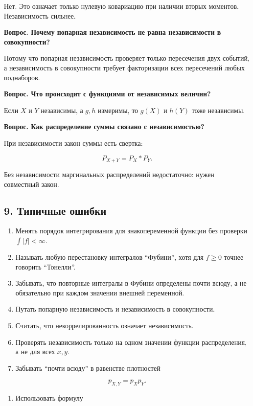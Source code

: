 \documentclass[
  11pt,
  a4paper,
]{article}
\providecommand{\tightlist}{%
  \setlength{\itemsep}{0pt}\setlength{\parskip}{0pt}}
\begin{document}
Нет. Это означает только нулевую ковариацию при наличии вторых моментов.
Независимость сильнее.

\textbf{Вопрос. Почему попарная независимость не равна независимости в
совокупности?}

Потому что попарная независимость проверяет только пересечения двух
событий, а независимость в совокупности требует факторизации всех
пересечений любых поднаборов.

\textbf{Вопрос. Что происходит с функциями от независимых величин?}

Если \(X\) и \(Y\) независимы, а \(g,h\) измеримы, то \(g(X)\) и
\(h(Y)\) тоже независимы.

\textbf{Вопрос. Как распределение суммы связано с независимостью?}

При независимости закон суммы есть свертка:

\[
P_{X+Y}=P_X*P_Y.
\]

Без независимости маргинальных распределений недостаточно: нужен
совместный закон.

\subsection{9. Типичные
ошибки}\label{ux442ux438ux43fux438ux447ux43dux44bux435-ux43eux448ux438ux431ux43aux438}

\begin{enumerate}
\def\labelenumi{\arabic{enumi}.}
\tightlist
\item
  Менять порядок интегрирования для знакопеременной функции без проверки
  \(\int |f|<\infty\).
\item
  Называть любую перестановку интегралов ``Фубини'', хотя для \(f\ge0\)
  точнее говорить ``Тонелли''.
\item
  Забывать, что повторные интегралы в Фубини определены почти всюду, а
  не обязательно при каждом значении внешней переменной.
\item
  Путать попарную независимость и независимость в совокупности.
\item
  Считать, что некоррелированность означает независимость.
\item
  Проверять независимость только на одном значении функции
  распределения, а не для всех \(x,y\).
\item
  Забывать ``почти всюду'' в равенстве плотностей
\end{enumerate}

\[
p_{X,Y}=p_Xp_Y.
\]

\begin{enumerate}
\def\labelenumi{\arabic{enumi}.}
\setcounter{enumi}{7}
\tightlist
\item
  Использовать формулу
\end{enumerate}
\end{document}
